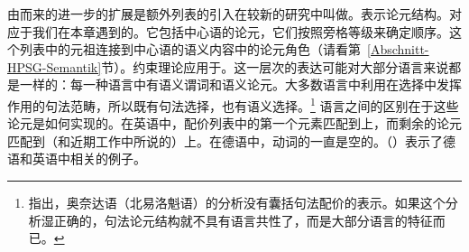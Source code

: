 由而来的进一步的扩展是额外列表的引入在较新的研究中叫做\argst{}。\argst 表示论元结构。\argstl 对应于我们在本章遇到的\subcatl 。它包括中心语的论元，它们按照旁格等级来确定顺序。这个列表中的元祖连接到中心语的语义内容中的论元角色（请看第~\ref{Abschnitt-HPSG-Semantik}节）。约束理论应用于\argstl 。这一层次的表达可能对大部分语言来说都是一样的：每一种语言中有语义谓词和语义论元。大多数语言中利用在选择中发挥作用的句法范畴，所以既有句法选择，也有语义选择。\footnote{%
\citet{KM2012a}指出，奥奈达语（北易洛魁语）的分析没有囊括句法配价的表示。如果这个分析湿正确的，句法论元结构就不具有语言共性了，而是大部分语言的特征而已。
}
语言之间的区别在于这些论元是如何实现的。在英语中，配价列表中的第一个元素匹配到\sprl 上，而剩余的论元匹配到\subcat （和近期工作中所说的\compsl  ）上。在德语中，动词的\sprl 一直是空的。（）表示了德语和英语中相关的例子。

